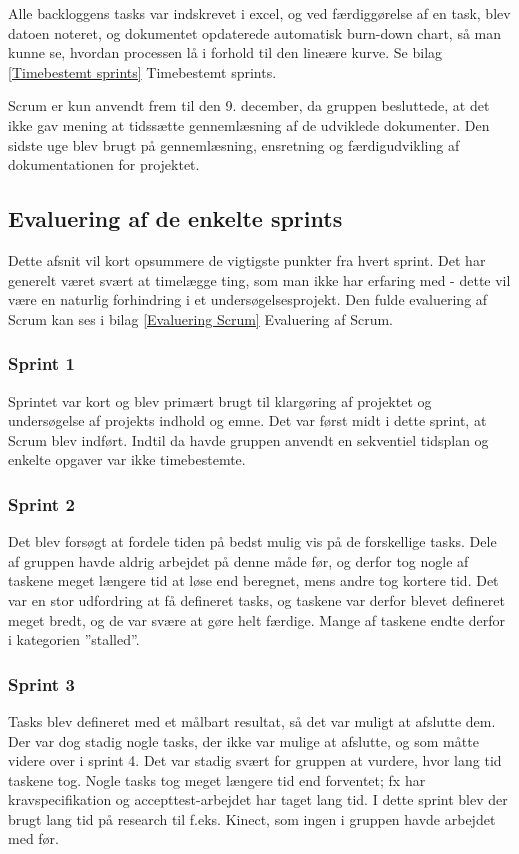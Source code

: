 Alle backloggens tasks var indskrevet i excel, og ved færdiggørelse af en task, blev datoen noteret, og dokumentet opdaterede automatisk burn-down chart, så man kunne se, hvordan processen lå i forhold til den lineære kurve. Se bilag \ref{Timebestemt sprints} Timebestemt sprints. 

Scrum er kun anvendt frem til den 9. december, da gruppen besluttede, at det ikke gav mening at tidssætte gennemlæsning af de udviklede dokumenter. Den sidste uge blev brugt på gennemlæsning, ensretning og færdigudvikling af dokumentationen for projektet.  

\subsection{Evaluering af de enkelte sprints} 
Dette afsnit vil kort opsummere de vigtigste punkter fra hvert sprint. Det har generelt været svært at timelægge ting, som man ikke har erfaring med - dette vil være en naturlig forhindring i et undersøgelsesprojekt. Den fulde evaluering af Scrum kan ses i bilag \ref{Evaluering Scrum} Evaluering af Scrum.

\subsubsection{Sprint 1} 
Sprintet var kort og blev primært brugt til klargøring af projektet og undersøgelse af projekts indhold og emne. Det var først midt i dette sprint, at Scrum blev indført. Indtil da havde gruppen anvendt en sekventiel tidsplan og enkelte opgaver var ikke timebestemte.

\subsubsection{Sprint 2} 
Det blev forsøgt at fordele tiden på bedst mulig vis på de forskellige tasks. Dele af gruppen havde aldrig arbejdet på denne måde før, og derfor tog nogle af taskene meget længere tid at løse end beregnet, mens andre tog kortere tid. Det var en stor udfordring at få defineret tasks, og taskene var derfor blevet defineret meget bredt, og de var svære at gøre helt færdige. Mange af taskene endte derfor i kategorien ”stalled”. 

\subsubsection{Sprint 3} 
Tasks blev defineret med et målbart resultat, så det var muligt at afslutte dem. Der var dog stadig nogle tasks, der ikke var mulige at afslutte, og som måtte videre over i sprint 4. Det var stadig svært for gruppen at vurdere, hvor lang tid taskene tog. Nogle tasks tog meget længere tid end forventet; fx har kravspecifikation og accepttest-arbejdet har taget lang tid. I dette sprint blev der brugt lang tid på research til f.eks. Kinect, som ingen i gruppen havde arbejdet med før.
 
